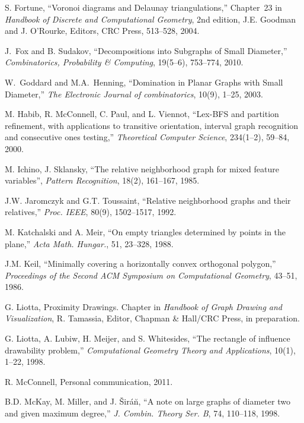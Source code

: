 \documentclass{llncs}
\begin{document}
\begin{thebibliography}{99}
 S. Fortune,
``Voronoi diagrams and Delaunay  triangulations,''
Chapter~23 in \emph{Handbook of Discrete and Computational Geometry},
2nd edition, J.E.  Goodman and J. O'Rourke, Editors,
CRC Press, 513--528, 2004.

 J.~Fox and B. Sudakov,
``Decompositions into Subgraphs of Small Diameter,''
\emph{Combinatorics, Probability \& Computing}, 
19(5--6), 753--774, 2010.

 W.~Goddard and M.A.~Henning,
``Domination in Planar Graphs with Small Diameter,''
\emph{The Electronic Journal of combinatorics},
10(9), 1--25, 2003.


 M. Habib, R. McConnell, C. Paul, and L. Viennot,
``Lex-BFS and partition refinement, with applications to transitive orientation,
interval graph recognition and consecutive ones testing,''
\emph{Theoretical Computer Science}, 234(1--2), 59--84, 2000.


 M. Ichino, J. Sklansky,
``The relative neighborhood graph for mixed feature variables'',
\emph{Pattern Recognition}, 18(2), 161--167, 1985.

  J.W. Jaromczyk and G.T. Toussaint,
``Relative neighborhood graphs and their relatives,''
\emph{Proc. IEEE}, 80(9), 1502--1517, 1992.


M. Katchalski and A. Meir, ``On empty triangles determined by
points in the plane,'' \emph{Acta Math. Hungar.}, 51, 23--328, 1988.

 J.M. Keil,
``Minimally covering a horizontally convex orthogonal polygon,''
\emph{Proceedings of the Second ACM Symposium on Computational Geometry},
43--51, 1986.

 G. Liotta, Proximity Drawings. Chapter in
\emph{Handbook of Graph Drawing and Visualization}, R. Tamassia,
Editor, Chapman \& Hall/CRC Press, in preparation.


  G. Liotta, A. Lubiw, H. Meijer, and S. Whitesides,
``The rectangle of influence drawability problem,''
\emph{Computational Geometry Theory and Applications}, 10(1), 1--22,
1998.

 R. McConnell, Personal communication, 2011.

  B.D. McKay, M. Miller, and J. \v{S}ir\'{a}\u{n},
``A note on large graphs of diameter two and given maximum degree,''
\emph{J. Combin. Theory Ser. B}, 74, 110--118,
1998.


\end{thebibliography}
\end{document}
